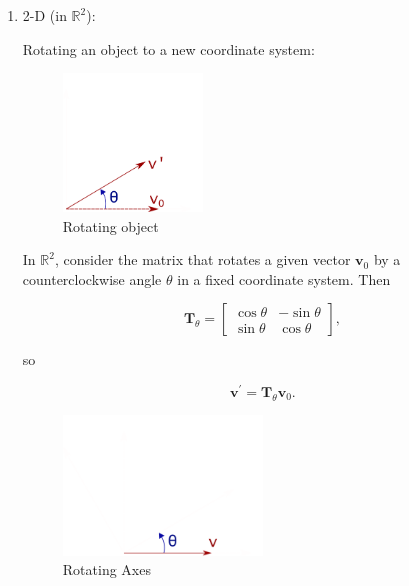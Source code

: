 \begin{enumerate}
    \item 2-D (in $\mathbb{R}^{2}$):

        Rotating an object to a new coordinate system:

        \begin{figure}[ht]
            \centering
            \includegraphics[width=0.35\textwidth]{img/RotationMatrix_1000}
            \caption{Rotating object}
            \label{fig:RotationMatrix_1000-png}
        \end{figure}

        In $\mathbb{R}^{2}$, consider the matrix that rotates a given
        vector $\mathbf{v}_{0}$ by a counterclockwise angle $\theta$ in
        a fixed coordinate system. Then

        \begin{equation}
            \mathbf{T}_{\theta} = \begin{bmatrix}
                \cos \theta & -\sin \theta \\
                \sin \theta & \cos \theta
            \end{bmatrix}
        ,\end{equation}

        so

        \begin{equation}
            \mathbf{v}^{'} = \mathbf{T}_{\theta}\mathbf{v}_{0}
        .\end{equation}

        \begin{figure}[ht]
            \centering
            \includegraphics[width=0.5\textwidth]{img/RotationMatrixAxes_1000}
            \caption{Rotating Axes}
            \label{fig:RotationMatrixAxes_1000-png}
        \end{figure}


\end{enumerate}
